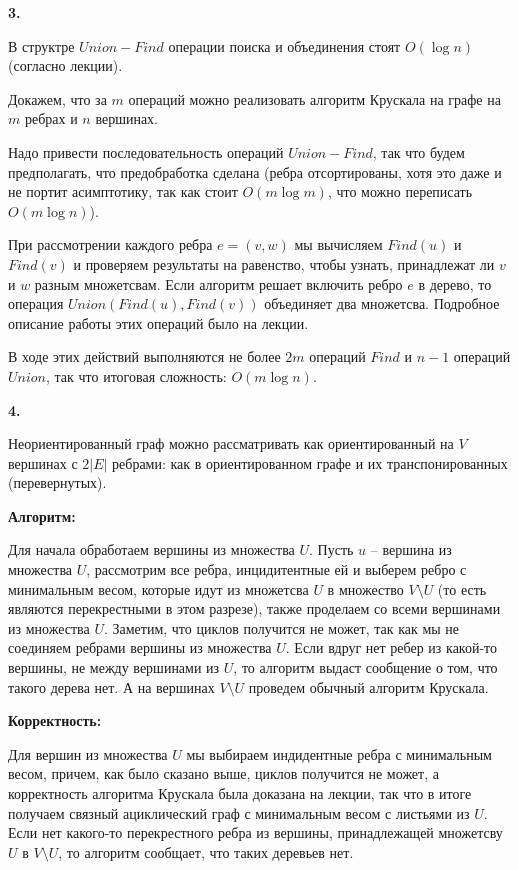 \documentclass[12pt]{extreport}
\begin{document}
\bigskip 
{\bf 3.} 

В структре $Union-Find$ операции поиска и объединения стоят $O(\log n)$ (согласно лекции). 

Докажем, что за $m$ операций можно реализовать алгоритм Крускала на графе на $m$ ребрах и $n$ вершинах. 

Надо привести последовательность операций $Union-Find$, так что будем предполагать, что предобработка сделана (ребра отсортированы, хотя это даже и не портит асимптотику, так как стоит $O(m \log m)$, что можно переписать $O(m \log n)$).

При рассмотрении каждого ребра $e = (v, w)$  мы вычисляем $Find(u)$ и $Find(v)$ и проверяем результаты на равенство, чтобы узнать, принадлежат ли $v$ и $w $ разным множетсвам. Если алгоритм решает включить ребро $e$ в дерево, то операция $Union(Find(u), Find(v))$ объединяет два множетсва. Подробное описание работы этих операций было на лекции.

В ходе этих действий выполняются не более $2m$ операций $Find$ и $n - 1$ операций $Union$, так что итоговая сложность: $O(m \log n)$.

\bigskip 
{\bf 4.} 

Неориентированный граф можно рассматривать как ориентированный на $V$ вершинах с $2|E|$ ребрами: как в ориентированном графе и их транспонированных (перевернутых). 

{\bf Алгоритм:} 

Для начала обработаем вершины из множества $U$. Пусть $u$ -- вершина из множества $U$, рассмотрим все ребра, инцидитентные ей и выберем ребро с минимальным весом, которые идут из множетсва $U$ в множество $V\setminus U$ (то есть являются перекрестными в этом разрезе), также проделаем со всеми вершинами из множества $U$. Заметим, что циклов получится не может, так как мы не соединяем ребрами вершины из множества $U$. Если вдруг нет ребер из какой-то вершины, не между вершинами из $U$, то алгоритм выдаст сообщение о том, что такого дерева нет. А на вершинах $V \setminus U$ проведем обычный алгоритм Крускала. 

\bigskip 
{\bf Корректность:}

Для вершин из множества $U$ мы выбираем индидентные ребра с минимальным весом, причем, как было сказано выше, циклов получится не может, а корректность алгоритма Крускала была доказана на лекции, так что в итоге получаем связный ациклический граф с минимальным весом с листьями из $U$. Если нет какого-то перекрестного ребра из вершины, принадлежащей множетсву $U$ в $V \setminus U$, то алгоритм сообщает, что таких деревьев нет. 
\end{document}
